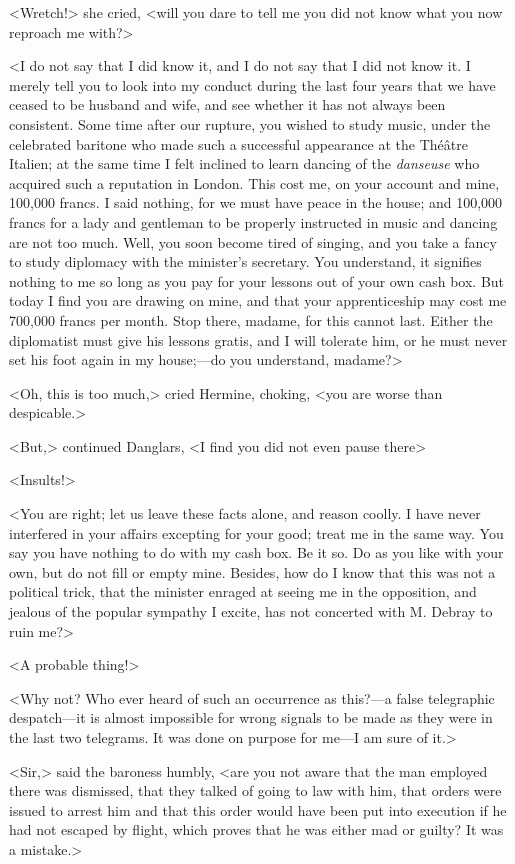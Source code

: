  <Wretch!> she cried, <will you dare to tell me you did not know what you now reproach me with?> 

 <I do not say that I did know it, and I do not say that I did not know it. I merely tell you to look into my conduct during the last four years that we have ceased to be husband and wife, and see whether it has not always been consistent. Some time after our rupture, you wished to study music, under the celebrated baritone who made such a successful appearance at the Théâtre Italien; at the same time I felt inclined to learn dancing of the \textit{danseuse} who acquired such a reputation in London. This cost me, on your account and mine, 100,000 francs. I said nothing, for we must have peace in the house; and 100,000 francs for a lady and gentleman to be properly instructed in music and dancing are not too much. Well, you soon become tired of singing, and you take a fancy to study diplomacy with the minister's secretary. You understand, it signifies nothing to me so long as you pay for your lessons out of your own cash box. But today I find you are drawing on mine, and that your apprenticeship may cost me 700,000 francs per month. Stop there, madame, for this cannot last. Either the diplomatist must give his lessons gratis, and I will tolerate him, or he must never set his foot again in my house;—do you understand, madame?> 

 <Oh, this is too much,> cried Hermine, choking, <you are worse than despicable.> 

 <But,> continued Danglars, <I find you did not even pause there\longdash> 

 <Insults!> 

 <You are right; let us leave these facts alone, and reason coolly. I have never interfered in your affairs excepting for your good; treat me in the same way. You say you have nothing to do with my cash box. Be it so. Do as you like with your own, but do not fill or empty mine. Besides, how do I know that this was not a political trick, that the minister enraged at seeing me in the opposition, and jealous of the popular sympathy I excite, has not concerted with M. Debray to ruin me?> 

 <A probable thing!> 

 <Why not? Who ever heard of such an occurrence as this?—a false telegraphic despatch—it is almost impossible for wrong signals to be made as they were in the last two telegrams. It was done on purpose for me—I am sure of it.> 

 <Sir,> said the baroness humbly, <are you not aware that the man employed there was dismissed, that they talked of going to law with him, that orders were issued to arrest him and that this order would have been put into execution if he had not escaped by flight, which proves that he was either mad or guilty? It was a mistake.> 

